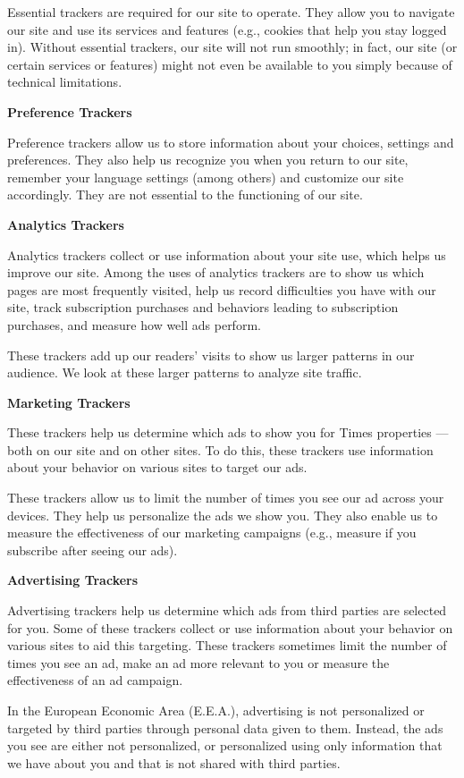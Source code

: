 Essential trackers are required for our site to operate. They allow you
to navigate our site and use its services and features (e.g., cookies
that help you stay logged in). Without essential trackers, our site will
not run smoothly; in fact, our site (or certain services or features)
might not even be available to you simply because of technical
limitations.

\textbf{Preference Trackers}

Preference trackers allow us to store information about your choices,
settings and preferences. They also help us recognize you when you
return to our site, remember your language settings (among others) and
customize our site accordingly. They are not essential to the
functioning of our site.

\textbf{Analytics Trackers}

Analytics trackers collect or use information about your site use, which
helps us improve our site. Among the uses of analytics trackers are to
show us which pages are most frequently visited, help us record
difficulties you have with our site, track subscription purchases and
behaviors leading to subscription purchases, and measure how well ads
perform.

These trackers add up our readers' visits to show us larger patterns in
our audience. We look at these larger patterns to analyze site traffic.

\textbf{Marketing Trackers}

These trackers help us determine which ads to show you for Times
properties --- both on our site and on other sites. To do this, these
trackers use information about your behavior on various sites to target
our ads.

These trackers allow us to limit the number of times you see our ad
across your devices. They help us personalize the ads we show you. They
also enable us to measure the effectiveness of our marketing campaigns
(e.g., measure if you subscribe after seeing our ads).

\textbf{Advertising Trackers}

Advertising trackers help us determine which ads from third parties are
selected for you. Some of these trackers collect or use information
about your behavior on various sites to aid this targeting. These
trackers sometimes limit the number of times you see an ad, make an ad
more relevant to you or measure the effectiveness of an ad campaign.

In the European Economic Area (E.E.A.), advertising is not personalized
or targeted by third parties through personal data given to them.
Instead, the ads you see are either not personalized, or personalized
using only information that we have about you and that is not shared
with third parties.

